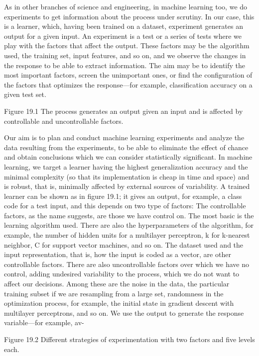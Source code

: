 As in other branches of science and engineering, in machine learning too, we do experiments to get information about the process under scrutiny. In our case, this is a learner, which, having been trained on a dataset, experiment generates an output for a given input. An experiment is a test or a series of tests where we play with the factors that affect the output. These factors may be the algorithm used, the training set, input features, and so on, and we observe the changes in the response to be able to extract information. The aim may be to identify the most important factors, screen the unimportant ones, or find the configuration of the factors that optimizes the response---for example, classification accuracy on a given test set.

Figure 19.1 The process generates an output given an input and is affected by controllable and uncontrollable factors.

Our aim is to plan and conduct machine learning experiments and analyze the data resulting from the experiments, to be able to eliminate the effect of chance and obtain conclusions which we can consider statistically significant. In machine learning, we target a learner having the highest generalization accuracy and the minimal complexity (so that its implementation is cheap in time and space) and is robust, that is, minimally affected by external sources of variability. A trained learner can be shown as in figure 19.1; it gives an output, for example, a class code for a test input, and this depends on two type of factors: The controllable factors, as the name suggests, are those we have control on. The most basic is the learning algorithm used. There are also the hyperparameters of the algorithm, for example, the number of hidden units for a multilayer perceptron, k for k-nearest neighbor, C for support vector machines, and so on. The dataset used and the input representation, that is, how the input is coded as a vector, are other controllable factors. There are also uncontrollable factors over which we have no control, adding undesired variability to the process, which we do not want to affect our decisions. Among these are the noise in the data, the particular training subset if we are resampling from a large set, randomness in the optimization process, for example, the initial state in gradient descent with multilayer perceptrons, and so on. We use the output to generate the response variable---for example, av-

Figure 19.2 Different strategies of experimentation with two factors and five levels each.

